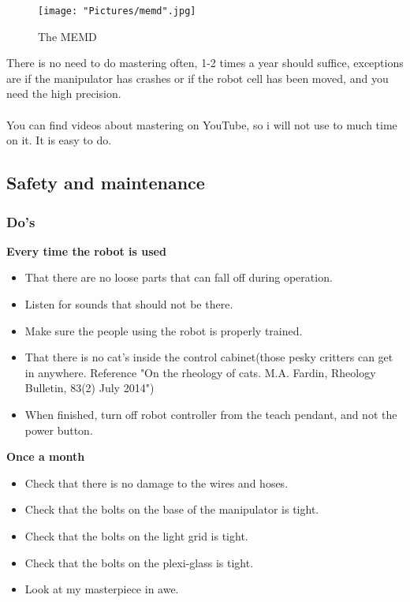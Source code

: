 \documentclass{article}
\begin{document}
        \begin{figure}[!h]
            \centering
            \texttt{[image: "Pictures/memd".jpg]}
            \caption{The MEMD}
        \end{figure}
        
        There is no need to do mastering often, 1-2 times a year should suffice, exceptions are if the manipulator has crashes or if the robot cell has been moved, and you need the high precision. 
        \\\\
        You can find videos about mastering on YouTube, so i will not use to much time on it. It is easy to do. 
        
        \newpage

    \subsection{Safety and maintenance}
        \subsubsection{Do's }
        \textbf{Every time the robot is used}
        \begin{itemize}
            \item That there are no loose parts that can fall off during operation.
            \item Listen for sounds that should not be there.
            \item Make sure the people using the robot is properly trained.
            \item That there is no cat's inside the control cabinet(those pesky critters can get in anywhere. Reference "On the rheology of cats. M.A. Fardin, Rheology Bulletin, 83(2) July 2014")
            \item When finished, turn off robot controller from the teach pendant, and not the power button.
        \end{itemize}
        
        \textbf{Once a month}
        \begin{itemize}
            \item Check that there is no damage to the wires and hoses.
            \item Check that the bolts on the base of the manipulator is tight. 
            \item Check that the bolts on the light grid is tight.
            \item Check that the bolts on the plexi-glass is tight.
            \item Look at my masterpiece in awe.
        \end{itemize}
        
\end{document}

